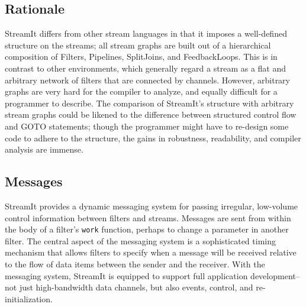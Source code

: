 \subsection{Rationale}

StreamIt differs from other stream languages in that it imposes a
well-defined structure on the streams; all stream graphs are built out
of a hierarchical composition of Filters, Pipelines, SplitJoins, and
FeedbackLoops.  This is in contrast to other environments, which
generally regard a stream as a flat and arbitrary network of filters
that are connected by channels.  However, arbitrary graphs are very
hard for the compiler to analyze, and equally difficult for a
programmer to describe.  The comparison of StreamIt's structure with
arbitrary stream graphs could be likened to the difference between
structured control flow and GOTO statements; though the programmer
might have to re-design some code to adhere to the structure, the
gains in robustness, readability, and compiler analysis are immense.

\subsection{Messages}

StreamIt provides a dynamic messaging system for passing irregular,
low-volume control information between filters and streams.  Messages
are sent from within the body of a filter's {\tt work} function,
perhaps to change a parameter in another filter.  The central aspect
of the messaging system is a sophisticated timing mechanism that
allows filters to specify when a message will be received relative to
the flow of data items between the sender and the receiver.  With the
messaging system, StreamIt is equipped to support full application
development--not just high-bandwidth data channels, but also events,
control, and re-initialization.
